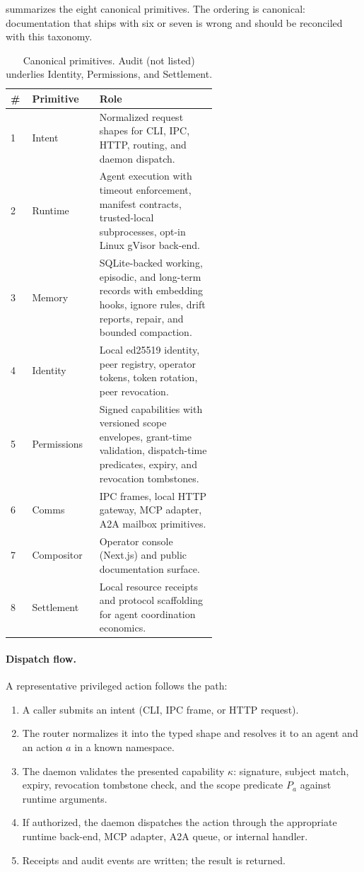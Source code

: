 \documentclass[11pt]{article}
\theoremstyle{plainsmall}
\begin{document}
 summarizes the eight canonical primitives. The ordering is canonical: documentation that ships with six or seven is wrong and should be reconciled with this taxonomy.

\begin{table}[h]
\centering
\caption{Canonical primitives. Audit (not listed) underlies Identity, Permissions, and Settlement.}
\label{tab:primitives}
\small
\begin{tabular}{@{}llp{0.58\linewidth}@{}}
\toprule
\# & Primitive & Role \\
\midrule
1 & Intent       & Normalized request shapes for CLI, IPC, HTTP, routing, and daemon dispatch. \\
2 & Runtime      & Agent execution with timeout enforcement, manifest contracts, trusted-local subprocesses, opt-in Linux gVisor back-end. \\
3 & Memory       & SQLite-backed working, episodic, and long-term records with embedding hooks, ignore rules, drift reports, repair, and bounded compaction. \\
4 & Identity     & Local ed25519 identity, peer registry, operator tokens, token rotation, peer revocation. \\
5 & Permissions  & Signed capabilities with versioned scope envelopes, grant-time validation, dispatch-time predicates, expiry, and revocation tombstones. \\
6 & Comms        & IPC frames, local HTTP gateway, MCP adapter, A2A mailbox primitives. \\
7 & Compositor   & Operator console (Next.js) and public documentation surface. \\
8 & Settlement   & Local resource receipts and protocol scaffolding for agent coordination economics. \\
\bottomrule
\end{tabular}
\end{table}

\paragraph{Dispatch flow.} A representative privileged action follows the path:
\begin{enumerate}[leftmargin=*,itemsep=0pt]
  \item A caller submits an intent (CLI, IPC frame, or HTTP request).
  \item The router normalizes it into the typed shape and resolves it to an agent and an action $a$ in a known namespace.
  \item The daemon validates the presented capability $\kappa$: signature, subject match, expiry, revocation tombstone check, and the scope predicate $P_a$ against runtime arguments.
  \item If authorized, the daemon dispatches the action through the appropriate runtime back-end, MCP adapter, A2A queue, or internal handler.
  \item Receipts and audit events are written; the result is returned.
\end{enumerate}
\end{document}
